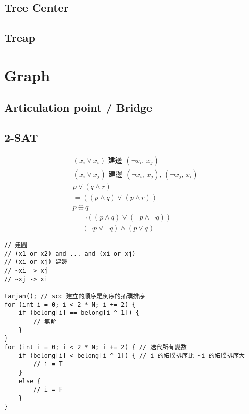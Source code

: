 \documentclass[10pt,oneside]{article}
\begin{document}
\begin{landscape}
\begin{multicols}{2}
\subsection{Tree Center}

\subsection{Treap}


\section{Graph}

\subsection{Articulation point / Bridge}

\subsection{2-SAT}

\begin{align*}
 &(x_i \lor x_i) \textit{ 建邊 } (\lnot x_i,\, x_j) \\
 &(x_i \lor x_j) \textit{ 建邊 } (\lnot x_i,\, x_j) ,\, (\lnot x_j,\, x_i) \\
&p \lor (q \land r)  \\
&= ((p \land q) \lor (p \land r)) \\
&p \oplus q   \\
&= \lnot ( (p \land q) \lor (\lnot p \land \lnot q))     \\
&= (\lnot p \lor \lnot q) \land (p \lor q)    
\end{align*}

\begin{lstlisting}
// 建圖
// (x1 or x2) and ... and (xi or xj)
// (xi or xj) 建邊
// ~xi -> xj
// ~xj -> xi

tarjan(); // scc 建立的順序是倒序的拓璞排序
for (int i = 0; i < 2 * N; i += 2) {
    if (belong[i] == belong[i ^ 1]) {
        // 無解
    }
}
for (int i = 0; i < 2 * N; i += 2) { // 迭代所有變數
    if (belong[i] < belong[i ^ 1]) { // i 的拓璞排序比 ~i 的拓璞排序大
        // i = T
    }
    else {
        // i = F
    }
}
\end{lstlisting}


\end{multicols}
\end{landscape}
\end{document}
